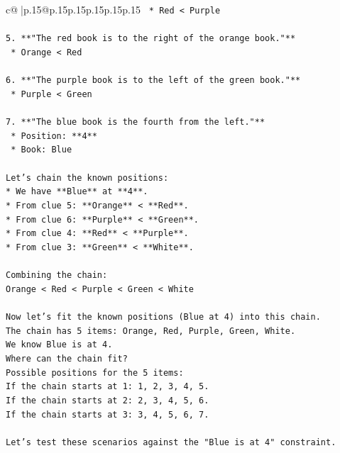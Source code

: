 \documentclass{article}
\begin{document}
{\begin{supertabular}{c@{$\;$}|p{.15\linewidth}@{}p{.15\linewidth}p{.15\linewidth}p{.15\linewidth}p{.15\linewidth}p{.15\linewidth}}
{{{\texttt{    *   Red < Purple} \\
\\ 
\texttt{5.  **"The red book is to the right of the orange book."**} \\
\texttt{    *   Orange < Red} \\
\\ 
\texttt{6.  **"The purple book is to the left of the green book."**} \\
\texttt{    *   Purple < Green} \\
\\ 
\texttt{7.  **"The blue book is the fourth from the left."**} \\
\texttt{    *   Position: **4**} \\
\texttt{    *   Book: Blue} \\
\\ 
\texttt{Let's chain the known positions:} \\
\texttt{*   We have **Blue** at **4**.} \\
\texttt{*   From clue 5: **Orange** < **Red**.} \\
\texttt{*   From clue 6: **Purple** < **Green**.} \\
\texttt{*   From clue 4: **Red** < **Purple**.} \\
\texttt{*   From clue 3: **Green** < **White**.} \\
\\ 
\texttt{Combining the chain:} \\
\texttt{Orange < Red < Purple < Green < White} \\
\\ 
\texttt{Now let's fit the known positions (Blue at 4) into this chain.} \\
\texttt{The chain has 5 items: Orange, Red, Purple, Green, White.} \\
\texttt{We know Blue is at 4.} \\
\texttt{Where can the chain fit?} \\
\texttt{Possible positions for the 5 items:} \\
\texttt{If the chain starts at 1: 1, 2, 3, 4, 5.} \\
\texttt{If the chain starts at 2: 2, 3, 4, 5, 6.} \\
\texttt{If the chain starts at 3: 3, 4, 5, 6, 7.} \\
\\ 
\texttt{Let's test these scenarios against the "Blue is at 4" constraint.} \\
\\ 
}}}
\end{supertabular}}
\end{document}
